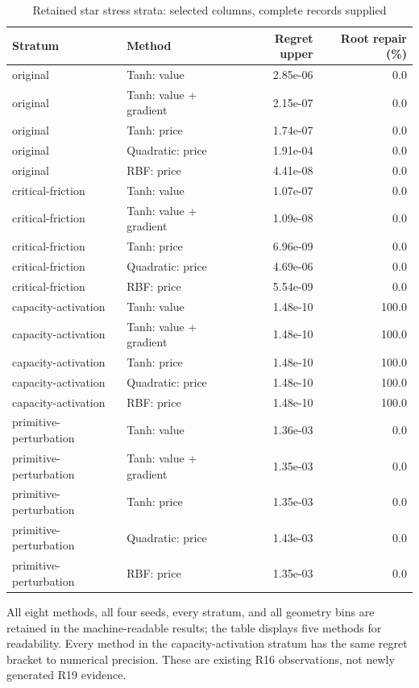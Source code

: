 \documentclass[11pt,letterpaper]{article}
\theoremstyle{definition}
\newcommand{\1}{\mathbf 1}
\begin{document}
\begin{table}[p]
\centering
\caption{Retained star stress strata: selected columns, complete records supplied}\label{tab:r19-star}
\setlength{\tabcolsep}{4pt}
\begin{tabular}{llrr}
\toprule
Stratum & Method & Regret upper & Root repair (\%) \\
\midrule
original & Tanh: value & 2.85e-06 & 0.0 \\
original & Tanh: value + gradient & 2.15e-07 & 0.0 \\
original & Tanh: price & 1.74e-07 & 0.0 \\
original & Quadratic: price & 1.91e-04 & 0.0 \\
original & RBF: price & 4.41e-08 & 0.0 \\
critical-friction & Tanh: value & 1.07e-07 & 0.0 \\
critical-friction & Tanh: value + gradient & 1.09e-08 & 0.0 \\
critical-friction & Tanh: price & 6.96e-09 & 0.0 \\
critical-friction & Quadratic: price & 4.69e-06 & 0.0 \\
critical-friction & RBF: price & 5.54e-09 & 0.0 \\
capacity-activation & Tanh: value & 1.48e-10 & 100.0 \\
capacity-activation & Tanh: value + gradient & 1.48e-10 & 100.0 \\
capacity-activation & Tanh: price & 1.48e-10 & 100.0 \\
capacity-activation & Quadratic: price & 1.48e-10 & 100.0 \\
capacity-activation & RBF: price & 1.48e-10 & 100.0 \\
primitive-perturbation & Tanh: value & 1.36e-03 & 0.0 \\
primitive-perturbation & Tanh: value + gradient & 1.35e-03 & 0.0 \\
primitive-perturbation & Tanh: price & 1.35e-03 & 0.0 \\
primitive-perturbation & Quadratic: price & 1.43e-03 & 0.0 \\
primitive-perturbation & RBF: price & 1.35e-03 & 0.0 \\
\bottomrule
\end{tabular}

\par\medskip\begin{minipage}{\textwidth}All eight methods, all four seeds, every stratum, and all geometry bins are retained in the machine-readable results; the table displays five methods for readability. Every method in the capacity-activation stratum has the same regret bracket to numerical precision. These are existing R16 observations, not newly generated R19 evidence.\end{minipage}
\end{table}
\end{document}
